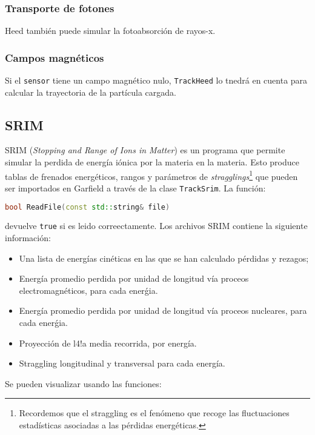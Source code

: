 \subsubsection{Transporte de fotones}

Heed también puede simular la fotoabsorción de rayos-x. 

\subsubsection{Campos magnéticos}

Si el \texttt{sensor} tiene un campo magnético nulo, \texttt{TrackHeed} lo tnedrá en cuenta para calcular la trayectoria de la partícula cargada.

\subsection{SRIM}

SRIM (\textit{Stopping and Range of Ions in Matter}) es un programa que permite simular la perdida de energía iónica por la materia en la materia. Esto produce tablas de frenados energéticos, rangos y parámetros de \textit{stragglings}\footnote{Recordemos que el straggling es el fenómeno que recoge las fluctuaciones estadísticas asociadas a las pérdidas energéticas.} que pueden ser importados en Garfield a través de la clase \texttt{TrackSrim}. La función: \\

\begin{lstlisting}[language=C++,style=c++]
bool ReadFile(const std::string& file)
\end{lstlisting}
\vspace*{0.6em}
devuelve \texttt{true} si es leido correectamente. Los archivos SRIM contiene la siguiente información: 

\begin{itemize}
    \item Una lista de energías cinéticas en las que se han calculado pérdidas y rezagos;
    \item Energía promedio perdida por unidad de longitud vía proceos electromagnéticos, para cada enerǵia. 
    \item Energía promedio perdida por unidad de longitud vía proceos nucleares, para cada enerǵia. 
    \item Proyección de l4!a media recorrida, por energía.
    \item Straggling longitudinal y transversal para cada energía. 
\end{itemize}
Se pueden visualizar usando las funciones: \\

